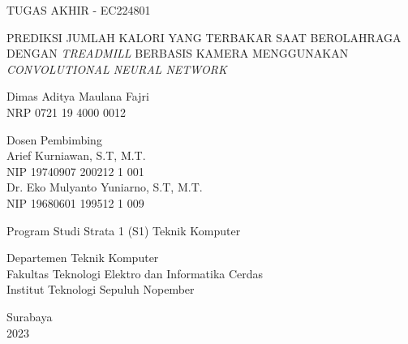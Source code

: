 \begin{large}
  TUGAS AKHIR - EC224801
\end{large}

\vspace{\fill}

\begin{spacing}{1.5}
  \begin{Large}
    PREDIKSI JUMLAH KALORI YANG TERBAKAR SAAT
    BEROLAHRAGA DENGAN \emph{TREADMILL}
    BERBASIS KAMERA MENGGUNAKAN
    \emph{CONVOLUTIONAL NEURAL NETWORK}
  \end{Large}
\end{spacing}

\vspace{\fill}

\begin{large}
  Dimas Aditya Maulana Fajri \\
  \textmd{NRP 0721 19 4000 0012}
\end{large}

\vspace{\fill}

\begin{large}
  \textmd{Dosen Pembimbing} \\
  Arief Kurniawan, S.T, M.T. \\
  \textmd{NIP 19740907 200212 1 001} \\
  Dr. Eko Mulyanto Yuniarno, S.T, M.T. \\
  \textmd{NIP 19680601 199512 1 009}
\end{large}

\vspace{\fill}

Program Studi Strata 1 (S1) Teknik Komputer \\

\mdseries

Departemen Teknik Komputer \\
Fakultas Teknologi Elektro dan Informatika Cerdas \\
Institut Teknologi Sepuluh Nopember

Surabaya \\
2023
